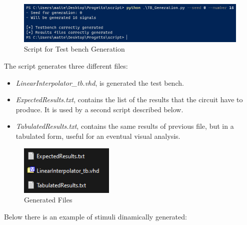 \begin{figure}[H]
    \centering
    \includegraphics[width=1\textwidth]{img/Chapter4/script1.png}
    \caption{Script for Test bench Generation}
    \label{fig:Script1}
\end{figure}

The script generates three different files:

\begin{itemize}
    \item \textit{LinearInterpolator\_tb.vhd}, is generated the test bench.
    \item \textit{ExpectedResults.txt}, contains the list of the results that the circuit have to produce. It is used by a second script described below.
    \item \textit{TabulatedResults.txt}, contains the same results of previous file, but in a tabulated form, useful for an eventual visual analysis.
\end{itemize}

\begin{figure}[H]
    \centering
    \includegraphics[width=0.4\textwidth]{img/Chapter4/GeneratedFiles.png}
    \caption{Generated Files}
    \label{fig:GenFiles}
\end{figure}

\newpage

Below there is an example of stimuli dinamically generated:

